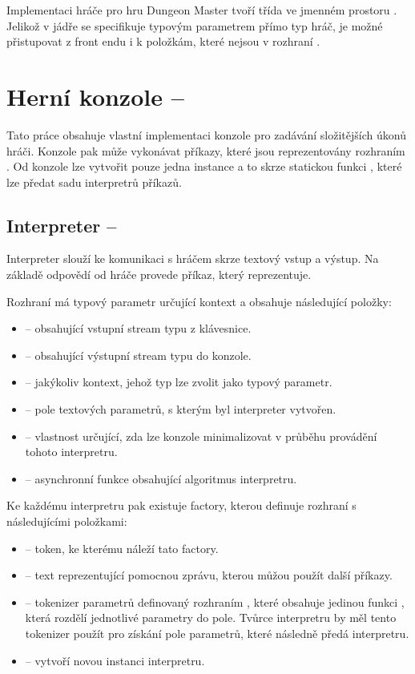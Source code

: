 Implementaci hráče pro hru Dungeon Master tvoří třída  ve jmenném prostoru . Jelikož v jádře se specifikuje typovým parametrem 
přímo typ hráč, je možné přistupovat z front endu i k položkám, které nejsou v rozhraní .




\section{Herní konzole -- }\label{game-console}
Tato práce obsahuje vlastní implementaci konzole pro zadávání složitějších úkonů hráči.  
Konzole pak může vykonávat příkazy, které jsou reprezentovány rozhraním . Od konzole lze vytvořit
pouze jedna instance a to skrze statickou funkci , které lze předat sadu
interpretrů příkazů.

\subsection{Interpreter -- }
Interpreter slouží ke komunikaci s hráčem skrze textový vstup a výstup. Na základě odpovědí od hráče provede příkaz, který reprezentuje.

Rozhraní  má typový parametr určující kontext a obsahuje následující položky:
\begin{itemize}
\item {} --  obsahující vstupní stream typu  z klávesnice.
\item {} --  obsahující výstupní stream typu  do konzole.
\item {} -- jakýkoliv kontext, jehož typ lze zvolit jako typový parametr.
\item {} -- pole textových parametrů, s kterým byl interpreter vytvořen.
\item {} -- vlastnost určující, zda lze konzole minimalizovat v průběhu provádění tohoto interpretru.
\item {} -- asynchronní funkce obsahující algoritmus interpretru. 
\end{itemize}

Ke každému interpretru pak existuje factory, kterou definuje rozhraní  s následujícími položkami:
\begin{itemize}
\item {} -- token, ke kterému náleží tato factory.
\item {} -- text reprezentující pomocnou zprávu, kterou můžou použít další příkazy. 
\item {} -- tokenizer parametrů definovaný rozhraním , které obsahuje jedinou funkci , 
	která rozdělí jednotlivé parametry do pole. Tvůrce interpretru by měl tento tokenizer použít pro získání pole parametrů, které 
	následně předá interpretru.
\item {} -- vytvoří novou instanci interpretru.
\end{itemize}

